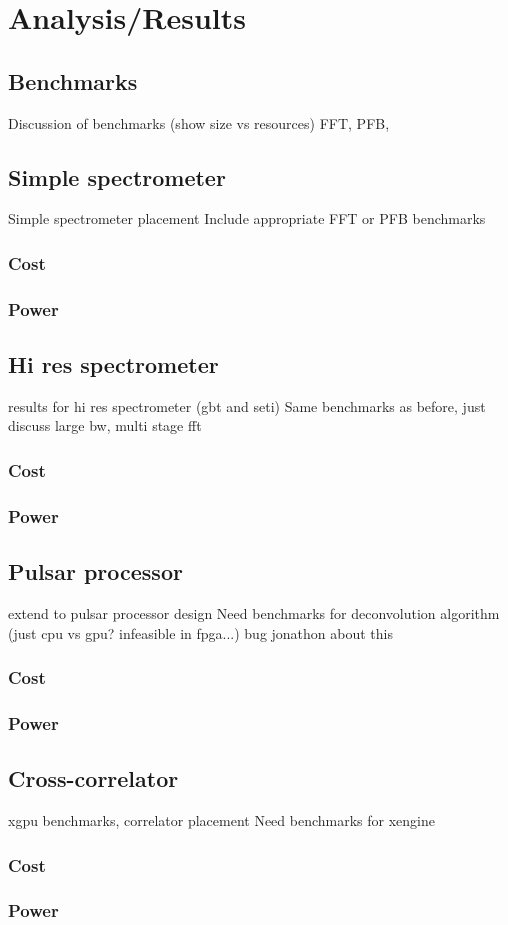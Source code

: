 \chapter{Analysis/Results}

\section{Benchmarks}
Discussion of benchmarks (show size vs resources) FFT, PFB,

\section{Simple spectrometer}
Simple spectrometer placement
Include appropriate FFT or PFB benchmarks
\subsection{Cost}
\subsection{Power}

\section{Hi res spectrometer}
results for hi res spectrometer (gbt and seti)
Same benchmarks as before, just discuss large bw, multi stage fft
\subsection{Cost}
\subsection{Power}

\section{Pulsar processor}
extend to pulsar processor design
Need benchmarks for deconvolution algorithm (just cpu vs gpu? infeasible in fpga...) bug jonathon about this
\subsection{Cost}
\subsection{Power}

\section{Cross-correlator}
xgpu benchmarks, correlator placement
Need benchmarks for xengine
\subsection{Cost}
\subsection{Power}
